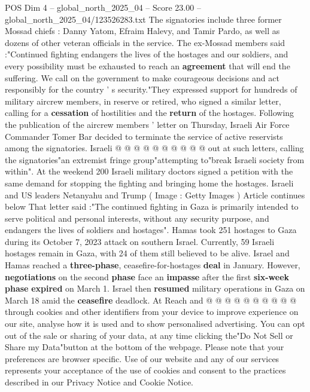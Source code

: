 \begin{textsample}{POS Dim 4 – global\_north\_2025\_04 – Score 23.00 – global\_north\_2025\_04/123526283.txt}
The signatories include three former Mossad chiefs : Danny Yatom, Efraim Halevy, and Tamir Pardo, as well as dozens of other veteran officials in the service.
The ex-Mossad members said :"Continued fighting endangers the lives of the hostages and our soldiers, and every possibility must be exhausted to reach an \textbf{agreement} that will end the suffering.
We call on the government to make courageous decisions and act responsibly for the country ' s security."They expressed support for hundreds of military aircrew members, in reserve or retired, who signed a similar letter, calling for a \textbf{cessation} of hostilities and the \textbf{return} of the hostages.
Following the publication of the aircrew members ' letter on Thursday, Israeli Air Force Commander Tomer Bar decided to terminate the service of active reservists among the signatories.
Israeli @ @ @ @ @ @ @ @ @ @ out at such letters, calling the signatories"an extremist fringe group"attempting to"break Israeli society from within".
At the weekend 200 Israeli military doctors signed a petition with the same demand for stopping the fighting and bringing home the hostages.
Israeli and US leaders Netanyahu and Trump ( Image : Getty Images ) Article continues below That letter said :"The continued fighting in Gaza is primarily intended to serve political and personal interests, without any security purpose, and endangers the lives of soldiers and hostages".
Hamas took 251 hostages to Gaza during its October 7, 2023 attack on southern Israel.
Currently, 59 Israeli hostages remain in Gaza, with 24 of them still believed to be alive.
Israel and Hamas reached a \textbf{three-phase}, ceasefire-for-hostages \textbf{deal} in January.
However, \textbf{negotiations} on the second \textbf{phase} face an \textbf{impasse} after the first \textbf{six-week} \textbf{phase} \textbf{expired} on March 1.
Israel then \textbf{resumed} military operations in Gaza on March 18 amid the \textbf{ceasefire} deadlock.
At Reach and @ @ @ @ @ @ @ @ @ @ through cookies and other identifiers from your device to improve experience on our site, analyse how it is used and to show personalised advertising.
You can opt out of the sale or sharing of your data, at any time clicking the"Do Not Sell or Share my Data"button at the bottom of the webpage.
Please note that your preferences are browser specific.
Use of our website and any of our services represents your acceptance of the use of cookies and consent to the practices described in our Privacy Notice and Cookie Notice.

\end{textsample}

